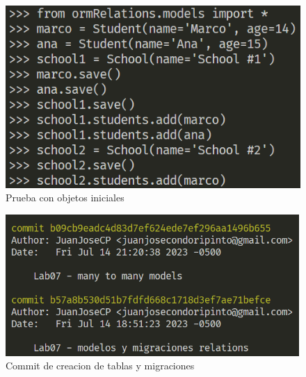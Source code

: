 \documentclass{article}
\begin{document}
        \begin{figure}
            \centering
            \includegraphics[width=150mm]{img/img4.png}
            \caption{Prueba con objetos iniciales}
            \label{fig:enter-label}
        \end{figure}
        \begin{figure}
            \centering
            \includegraphics[width=150mm]{img/commit2.png}
            \caption{Commit de creacion de tablas y migraciones}
            \label{fig:enter-label}
        \end{figure}
\end{document}
